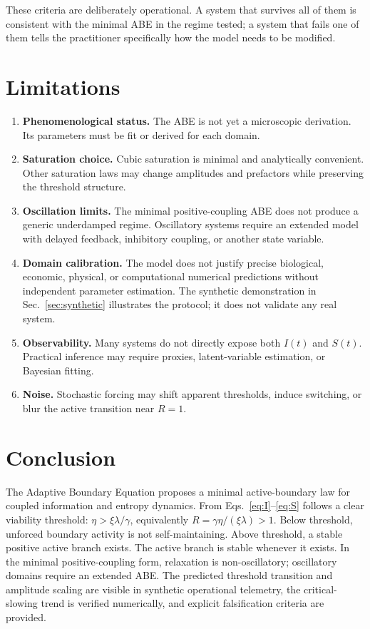 \documentclass[11pt]{article}
\begin{document}
These criteria are deliberately operational. A system that survives all of them is consistent with the minimal ABE in the regime tested; a system that fails one of them tells the practitioner specifically how the model needs to be modified.

\section{Limitations}
\begin{enumerate}
  \item \textbf{Phenomenological status.} The ABE is not yet a microscopic derivation. Its parameters must be fit or derived for each domain.
  \item \textbf{Saturation choice.} Cubic saturation is minimal and analytically convenient. Other saturation laws may change amplitudes and prefactors while preserving the threshold structure.
  \item \textbf{Oscillation limits.} The minimal positive-coupling ABE does not produce a generic underdamped regime. Oscillatory systems require an extended model with delayed feedback, inhibitory coupling, or another state variable.
  \item \textbf{Domain calibration.} The model does not justify precise biological, economic, physical, or computational numerical predictions without independent parameter estimation. The synthetic demonstration in Sec.~\ref{sec:synthetic} illustrates the protocol; it does not validate any real system.
  \item \textbf{Observability.} Many systems do not directly expose both $I(t)$ and $S(t)$. Practical inference may require proxies, latent-variable estimation, or Bayesian fitting.
  \item \textbf{Noise.} Stochastic forcing may shift apparent thresholds, induce switching, or blur the active transition near $R=1$.
\end{enumerate}

\section{Conclusion}
The Adaptive Boundary Equation proposes a minimal active-boundary law for coupled information and entropy dynamics. From Eqs.~\eqref{eq:I}--\eqref{eq:S} follows a clear viability threshold: $\eta>\xi\lambda/\gamma$, equivalently $R=\gamma\eta/(\xi\lambda)>1$. Below threshold, unforced boundary activity is not self-maintaining. Above threshold, a stable positive active branch exists. The active branch is stable whenever it exists. In the minimal positive-coupling form, relaxation is non-oscillatory; oscillatory domains require an extended ABE. The predicted threshold transition and amplitude scaling are visible in synthetic operational telemetry, the critical-slowing trend is verified numerically, and explicit falsification criteria are provided.
\end{document}
